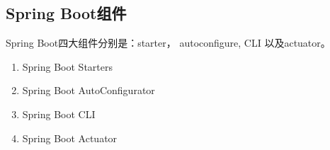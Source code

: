 \documentclass[../../../interview-questions.tex]{subfiles}
\begin{document}
\subsection{Spring Boot组件}

Spring Boot四大组件分别是：starter， autoconfigure, CLI 以及actuator。

\begin{enumerate}
    \item {Spring Boot Starters}
    \item {Spring Boot AutoConfigurator}
    \item {Spring Boot CLI}
    \item {Spring Boot Actuator}
\end{enumerate}
\end{document}
